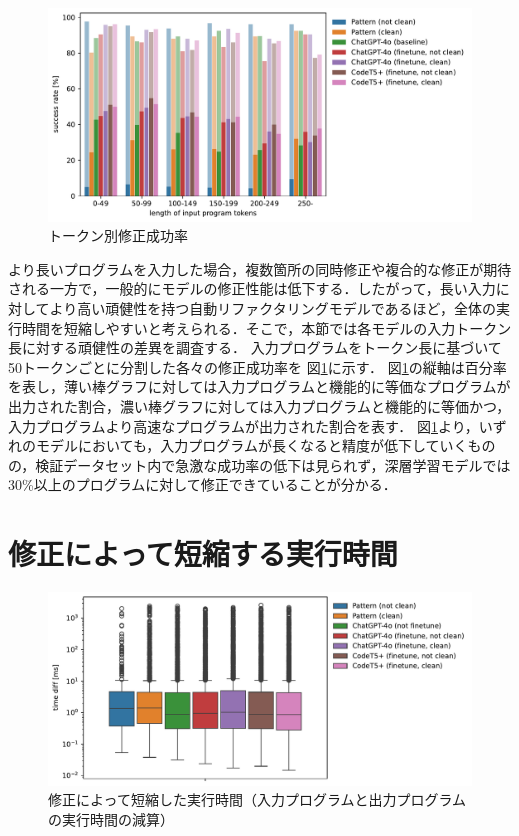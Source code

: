 \documentclass[11pt]{jreport}
\newcommand{\fixtwo}[1]{#1}
\begin{document}
\begin{figure}[t]
\begin{center}
\includegraphics[width=0.867\linewidth]{Omori_fig/figure-token.pdf}
\caption{トークン別修正成功率}
\label{fig:eval-1:result-token}
\end{center}
\end{figure}

\fixtwo{より長いプログラムを入力した場合，複数箇所の同時修正や複合的な修正が期待される一方で，一般的にモデルの修正性能は低下する．したがって，長い入力に対してより高い頑健性を持つ自動リファクタリングモデルであるほど，全体の実行時間を短縮しやすいと考えられる．そこで，本節では各モデルの入力トークン長に対する頑健性の差異を調査する．}
入力プログラムをトークン長に基づいて50トークンごとに分割した各々の修正成功率を
図\ref{fig:eval-1:result-token}に示す．
図\ref{fig:eval-1:result-token}の縦軸は百分率を表し，薄い棒グラフに対しては入力プログラムと機能的に等価なプログラムが出力された割合，濃い棒グラフに対しては入力プログラムと機能的に等価かつ，入力プログラムより高速なプログラムが出力された割合を表す．
図\ref{fig:eval-1:result-token}より，いずれのモデルにおいても，入力プログラムが長くなると精度が低下していくものの，\fixtwo{検証データセット内で急激な成功率の低下は見られず，}深層学習モデルでは30\%以上のプログラムに対して修正できていることが分かる．





\section{修正によって短縮する実行時間}


\begin{figure}[t]
\begin{center}
\includegraphics[width=0.867\linewidth]{Omori_fig/figure.pdf}
\caption{修正によって短縮した実行時間（入力プログラムと出力プログラムの実行時間の減算）}
\label{fig:eval-1:result-fast-time}
\end{center}
\end{figure}
\end{document}
